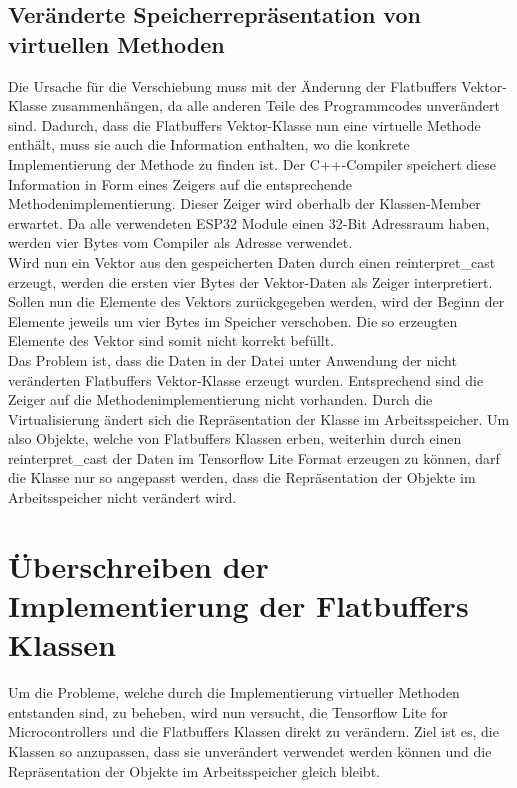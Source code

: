 \subsection{Veränderte Speicherrepräsentation von virtuellen Methoden}
    Die Ursache für die Verschiebung muss mit der Änderung der Flatbuffers Vektor-Klasse zusammenhängen, da alle anderen Teile des Programmcodes unverändert sind. Dadurch, dass die Flatbuffers Vektor-Klasse nun eine virtuelle Methode enthält, muss sie auch die Information enthalten, wo die konkrete Implementierung der Methode zu finden ist. Der C++-Compiler speichert diese Information in Form eines Zeigers auf die entsprechende Methodenimplementierung. Dieser Zeiger wird oberhalb der Klassen-Member erwartet. Da alle verwendeten ESP32 Module einen 32-Bit Adressraum haben, werden vier Bytes vom Compiler als Adresse verwendet.\\ Wird nun ein Vektor aus den gespeicherten Daten durch einen reinterpret\_cast erzeugt, werden die ersten vier Bytes der Vektor-Daten als Zeiger interpretiert. Sollen nun die Elemente des Vektors zurückgegeben werden, wird der Beginn der Elemente jeweils um vier Bytes im Speicher verschoben. Die so erzeugten Elemente des Vektor sind somit nicht korrekt befüllt.\\ Das Problem ist, dass die Daten in der Datei unter Anwendung der nicht veränderten Flatbuffers Vektor-Klasse erzeugt wurden. Entsprechend sind die Zeiger auf die Methodenimplementierung nicht vorhanden. Durch die Virtualisierung ändert sich die Repräsentation der Klasse im Arbeitsspeicher. Um also Objekte, welche von Flatbuffers Klassen erben, weiterhin durch einen reinterpret\_cast der Daten im Tensorflow Lite Format erzeugen zu können, darf die Klasse nur so angepasst werden, dass die Repräsentation der Objekte im Arbeitsspeicher nicht verändert wird. 

\section{Überschreiben der Implementierung der Flatbuffers Klassen}
    Um die Probleme, welche durch die Implementierung virtueller Methoden entstanden sind, zu beheben, wird nun versucht, die Tensorflow Lite for Microcontrollers und die Flatbuffers Klassen direkt zu verändern. Ziel ist es, die Klassen so anzupassen, dass sie unverändert verwendet werden können und die Repräsentation der Objekte im Arbeitsspeicher gleich bleibt.

